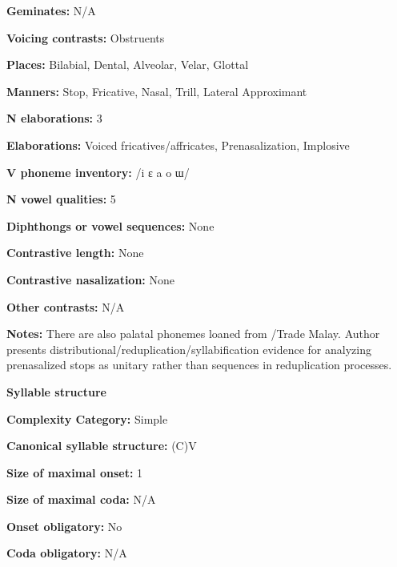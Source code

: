 \textbf{Geminates:} N/A



\textbf{Voicing contrasts:} Obstruents



\textbf{Places:} Bilabial, Dental, Alveolar, Velar, Glottal



\textbf{Manners:} Stop, Fricative, Nasal, Trill, Lateral Approximant



\textbf{N elaborations:} 3



\textbf{Elaborations:} Voiced fricatives/affricates, Prenasalization, Implosive



\textbf{V phoneme inventory:} /i ɛ a o ɯ/



\textbf{N vowel qualities:} 5



\textbf{Diphthongs or vowel sequences:} None



\textbf{Contrastive length:} None



\textbf{Contrastive nasalization:} None



\textbf{Other contrasts:} N/A



\textbf{Notes:} There are also palatal phonemes loaned from /Trade Malay. Author presents distributional/reduplication/syllabification evidence for analyzing prenasalized stops as unitary rather than sequences in reduplication processes.



\textbf{Syllable structure}



\textbf{Complexity Category:} Simple



\textbf{Canonical syllable structure:} (C)V \citep[30-1]{Donohue1999}



\textbf{Size of maximal onset:} 1



\textbf{Size of maximal coda:} N/A



\textbf{Onset obligatory:} No



\textbf{Coda obligatory:} N/A



